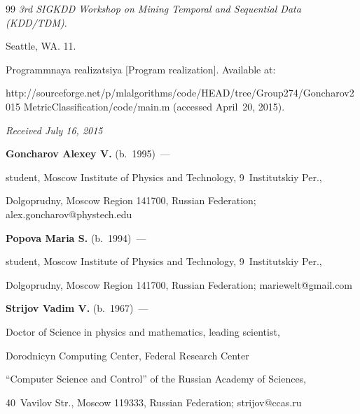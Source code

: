 {{\begin{thebibliography}{99}
\textit{3rd SIGKDD Workshop on Mining Temporal and Sequential Data (KDD/TDM)}. 

Seattle, WA. 11.





Programmnaya realizatsiya [Program realization]. Available at: 

{\sf http://sourceforge.net/p/mlalgorithms/code/HEAD/tree/Group274/Goncharov2015 MetricClassification/code/main.m} (accessed April~20, 2015).

\end{thebibliography}

} }





\vspace*{-1pt}



\hfill{\small\textit{Received July 16, 2015}}

    

    \Contr



\noindent

\textbf{Goncharov Alexey V.} (b.\ 1995)~---

 student, Moscow Institute of Physics and Technology, 9~Institutskiy Per., 

 Dolgoprudny, Moscow Region 141700, Russian Federation; alex.goncharov@phystech.edu

 

 \vspace*{3pt}



\noindent

\textbf{Popova Maria S.} (b.\ 1994)~--- 

student, Moscow Institute of Physics and Technology, 9~Institutskiy Per., 

Dolgoprudny, Moscow Region 141700, Russian Federation; mariewelt@gmail.com



\vspace*{3pt}



\noindent

\textbf{Strijov Vadim V.} (b.\ 1967)~---

 Doctor of Science in physics and mathematics, leading scientist, 

 Dorodnicyn Computing Center, Federal Research Center 

 ``Computer Science and Control'' of the Russian Academy of Sciences, 

 40~Vavilov Str., Moscow 119333, Russian Federation; strijov@ccas.ru



 \label{end\stat}





\renewcommand{\bibname}{\protect\rm Литература} 

